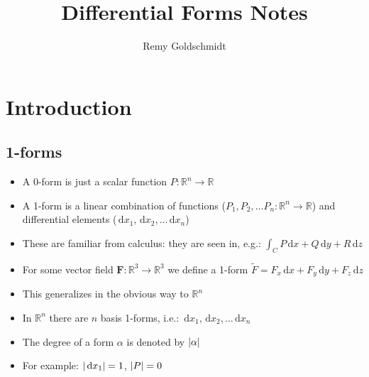 \documentclass[a4paper,11pt]{report}
\title{Differential Forms Notes}
\author{Remy Goldschmidt}
\newcommand{\real}{\ensuremath{\mathbb{R}}}
\newcommand{\diff}{\ensuremath{\, \mathrm{d}}}
\DeclarePairedDelimiter{\abs}{\lvert}{\rvert}
\begin{document}
\maketitle

\chapter{Introduction}
\section{1-forms}
\begin{itemize} \itemsep -2pt
    \item A 0-form is just a scalar function $P : \real^n \to \mathbb{R}$
    \item A 1-form is a linear combination of functions ($P_1, P_2, \dots P_n : \mathbb{R}^n \to \mathbb{R}$) and differential elements ($\diff x_1, \diff x_2, \dots \diff x_n$)
    \item These are familiar from calculus: they are seen in, e.g.: $\int_C P \diff x + Q \diff y + R \diff z$
    \item For some vector field $\mathbf{F} : \real^3 \to \real^3$ we define a 1-form $\widetilde{F} = F_x \diff x + F_y \diff y + F_z \diff z$
    \item This generalizes in the obvious way to $\real^n$
    \item In $\real^n$ there are $n$ basis 1-forms, i.e.: $\diff x_1, \diff x_2, \dots \diff x_n$
    \item The degree of a form $\alpha$ is denoted by $\abs{\alpha}$
    \item For example: $\abs{\diff x_1} = 1$, $\abs{P} = 0$
\end{itemize}
\end{document}
